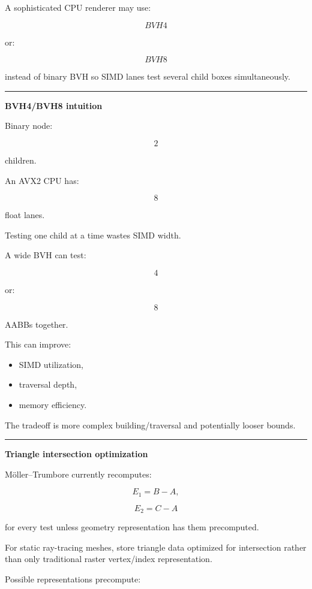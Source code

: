 A sophisticated CPU renderer may use:

\[
BVH4
\]

or:

\[
BVH8
\]

instead of binary BVH so SIMD lanes test several child boxes simultaneously.

\begin{center}\rule{0.5\linewidth}{0.5pt}\end{center}

\textbf{BVH4/BVH8 intuition}

Binary node:

\[
2
\]

children.

An AVX2 CPU has:

\[
8
\]

float lanes.

Testing one child at a time wastes SIMD width.

A wide BVH can test:

\[
4
\]

or:

\[
8
\]

AABBs together.

This can improve:

\begin{itemize}
\tightlist
\item
  SIMD utilization,
\item
  traversal depth,
\item
  memory efficiency.
\end{itemize}

The tradeoff is more complex building/traversal and potentially looser bounds.

\begin{center}\rule{0.5\linewidth}{0.5pt}\end{center}

\textbf{Triangle intersection optimization}

Möller--Trumbore currently recomputes:

\[
E_1=B-A,
\]

\[
E_2=C-A
\]

for every test unless geometry representation has them precomputed.

For static ray-tracing meshes, store triangle data optimized for intersection rather than only traditional raster vertex/index representation.

Possible representations precompute:

